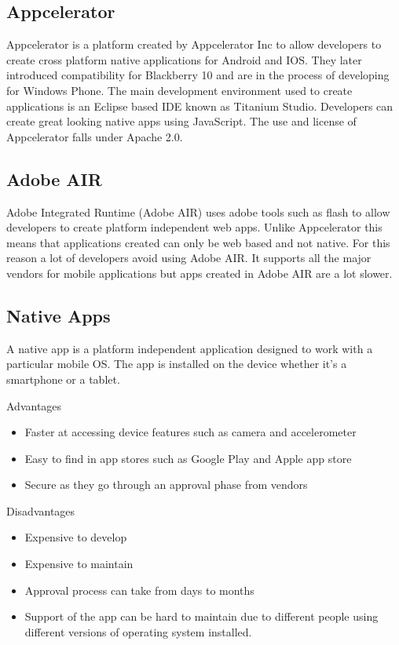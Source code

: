 \newpage
\subsection{Appcelerator}

Appcelerator is a platform created by Appcelerator Inc to allow developers to
create cross platform native applications for Android and IOS. They later
introduced compatibility for Blackberry 10 and are in the process of developing
for Windows Phone. The main development environment used to create applications
is an Eclipse based IDE known as Titanium Studio. Developers can create great
looking native apps using JavaScript. The use and license of Appcelerator falls
under Apache 2.0.

\subsection{Adobe AIR}

Adobe Integrated Runtime (Adobe AIR) uses adobe tools such as flash to allow
developers to create platform independent web apps. Unlike Appcelerator this
means that applications created can only be web based and not native. For this
reason a lot of developers avoid using Adobe AIR. It supports all the major
vendors for mobile applications but apps created in Adobe AIR are a lot slower.


\newpage
\subsection{Native Apps}

A native app is a platform independent application designed to work with a
particular mobile OS. The app is installed on the device whether it’s a
smartphone or a tablet.

Advantages

\begin{itemize}
    \item Faster at accessing device features such as camera and accelerometer
    \item Easy to find in app stores such as Google Play and Apple app store
    \item Secure as they go through an approval phase from vendors
\end{itemize}


Disadvantages

\begin{itemize}
    \item Expensive to develop
    \item Expensive to maintain
    \item Approval process can take from days to months
    \item Support of the app can be hard to maintain due to different people
    using different versions of operating system installed.
\end{itemize}

